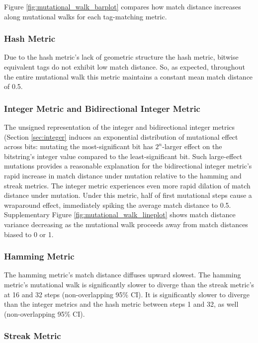 Figure \ref{fig:mutational_walk_barplot} compares how match distance increases along mutational walks for each tag-matching metric.

\subsubsection{Hash Metric}

Due to the hash metric's lack of geometric structure the hash metric, bitwise equivalent tags do not exhibit low match distance.
So, as expected, throughout the entire mutational walk this metric maintains a constant mean match distance of 0.5.

\subsubsection{Integer Metric and Bidirectional Integer Metric}

The unsigned representation of the integer and bidirectional integer metrics (Section \ref{sec:integer} induces an exponential distribution of mutational effect across bits: mutating the most-significant bit has $2^n$-larger effect on the bitstring's integer value compared to the least-significant bit.
Such large-effect mutations provides a reasonable explanation for the bidirectional integer metric's rapid increase in match distance under mutation relative to the hamming and streak metrics. 
The integer metric experiences even more rapid dilation of match distance under mutation.
Under this metric, half of first mutational steps cause a wraparound effect, immediately spiking the average match distance to 0.5.
Supplementary Figure \ref{fig:mutational_walk_lineplot} shows match distance variance decreasing as the mutational walk proceeds away from match distances biased to 0 or 1.

\subsubsection{Hamming Metric}

The hamming metric's match distance diffuses upward slowest.
The hamming metric's mutational walk is significantly slower to diverge than the streak metric's at 16 and 32 steps (non-overlapping 95\% CI).
It is significantly slower to diverge than the integer metrics and the hash metric between steps 1 and 32, as well (non-overlapping 95\% CI).

\subsubsection{Streak Metric}

